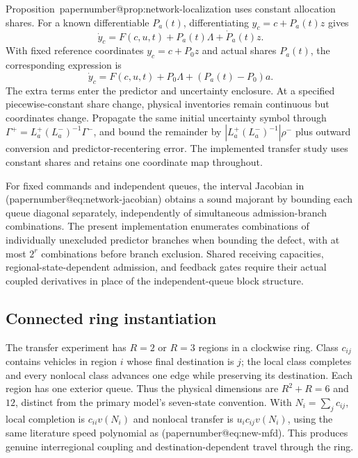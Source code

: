 \documentclass[preprint,12pt]{elsarticle}
\makeatletter
\numberwithin{equation}{section}
\newcommand{\papernumber}[1]{\csname papernumber@#1\endcsname}
\makeatother
\begin{document}
Proposition~\papernumber{prop:network-localization} uses constant allocation shares.
For a known differentiable $P_a(t)$, differentiating $y_c=c+P_a(t)z$ gives
\begin{equation}
 \dot y_c=F(c,u,t)+P_a(t)\Lambda+\dot P_a(t)z.
 \label{supp:detail:eq:network-varying-allocation}
\end{equation}
With fixed reference coordinates $y_c=c+P_0z$ and actual shares $P_a(t)$,
the corresponding expression is
\begin{equation}
 \dot y_c=F(c,u,t)+P_0\Lambda+(P_a(t)-P_0)a.
 \label{supp:detail:eq:network-uncertain-allocation}
\end{equation}
The extra terms enter the predictor and uncertainty enclosure. At a specified
piecewise-constant share change, physical inventories remain continuous but
coordinates change. Propagate the same initial uncertainty symbol through
$\Gamma^+=L_a^+(L_a^-)^{-1}\Gamma^-$, and bound the remainder by
$|L_a^+(L_a^-)^{-1}|\rho^-$ plus outward conversion and predictor-recentering
error. The implemented
transfer study uses constant shares and retains one coordinate map throughout.

For fixed commands and independent queues, the interval Jacobian in
(\papernumber{eq:network-jacobian}) obtains a sound majorant by bounding each queue
diagonal separately, independently of simultaneous admission-branch
combinations. The present implementation enumerates combinations of
individually unexcluded predictor branches when bounding the defect, with at most
$2^r$ combinations before branch exclusion. Shared receiving capacities,
regional-state-dependent admission, and feedback gates require their actual
coupled derivatives in place of the independent-queue block structure.

\subsection{Connected ring instantiation}

The transfer experiment has $R=2$ or $R=3$ regions in a clockwise ring. Class
$c_{ij}$ contains vehicles in region $i$ whose final destination is $j$;
the local class completes and every nonlocal class advances one edge while
preserving its destination. Each region has one exterior queue. Thus the
physical dimensions are $R^2+R=6$ and $12$, distinct from the primary model's
seven-state convention. With $N_i=\sum_jc_{ij}$, local completion is
$c_{ii}v(N_i)$ and nonlocal transfer is $u_i c_{ij}v(N_i)$, using the same
literature speed polynomial as (\papernumber{eq:new-mfd}). This produces genuine
interregional coupling and destination-dependent travel through the ring.
\end{document}
